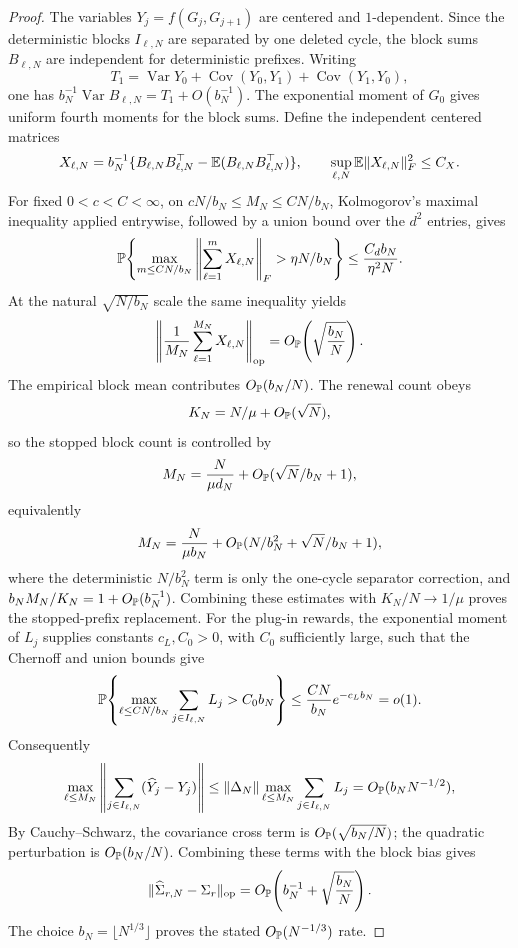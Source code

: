 \begin{lemma}
\begin{proof}
The variables \(Y_j=f(G_j,G_{j+1})\) are centered and \(1\)-dependent.  Since
the deterministic blocks \(I_{\ell,N}\) are separated by one deleted cycle,
the block sums \(B_{\ell,N}\) are independent for deterministic prefixes.
Writing
\[
T_1=\operatorname{Var}Y_0+\operatorname{Cov}(Y_0,Y_1)
+\operatorname{Cov}(Y_1,Y_0),
\]
one has \(b_N^{-1}\operatorname{Var}B_{\ell,N}=T_1+O(b_N^{-1})\).  The
exponential moment of \(G_0\) gives uniform fourth moments for the block sums.
Define the independent centered matrices
\[
X_{\ell,N}=b_N^{-1}\{B_{\ell,N}B_{\ell,N}^{\top}
-\mathbb{E}(B_{\ell,N}B_{\ell,N}^{\top})\},
\qquad \sup_{\ell,N}\mathbb{E}\|X_{\ell,N}\|_F^2\le C_X.
\]
For fixed \(0<c<C<\infty\), on
\(cN/b_N\le M_N\le CN/b_N\), Kolmogorov's maximal inequality applied
entrywise, followed by a union bound over the \(d^2\) entries, gives
\[
\mathbb{P}\!\left\{
\max_{m\le CN/b_N}\left\|\sum_{\ell=1}^mX_{\ell,N}\right\|_F
>\eta N/b_N\right\}
\le \frac{C_d b_N}{\eta^2N}.
\]
At the natural \(\sqrt{N/b_N}\) scale the same inequality yields
\[
\left\|\frac1{M_N}\sum_{\ell=1}^{M_N}X_{\ell,N}\right\|_{\rm op}
=O_{\mathbb{P}}\!\left(\sqrt{\frac{b_N}{N}}\right).
\]
The empirical block mean contributes \(O_{\mathbb{P}}(b_N/N)\).  The renewal count
obeys
\[
K_N=N/\mu+O_{\mathbb{P}}(\sqrt N),
\]
so the stopped block count is controlled by
\[
M_N=\frac{N}{\mu d_N}+O_{\mathbb{P}}(\sqrt N/b_N+1),
\]
equivalently
\[
M_N=\frac{N}{\mu b_N}
  +O_{\mathbb{P}}(N/b_N^2+\sqrt N/b_N+1),
\]
where the deterministic \(N/b_N^2\) term is only the one-cycle separator
correction, and \(b_NM_N/K_N=1+O_{\mathbb{P}}(b_N^{-1})\).  Combining these estimates
with \(K_N/N\to1/\mu\) proves the stopped-prefix replacement.  For the plug-in
rewards, the exponential moment of \(L_j\) supplies constants \(c_L,C_0>0\),
with \(C_0\) sufficiently large, such that the Chernoff and union bounds give
\[
\mathbb{P}\!\left\{
\max_{\ell\le CN/b_N}\sum_{j\in I_{\ell,N}}L_j>C_0b_N
\right\}
\le \frac{CN}{b_N}e^{-c_Lb_N}=o(1).
\]
Consequently
\[
\max_{\ell\le M_N}\left\|\sum_{j\in I_{\ell,N}}(\widehat Y_j-Y_j)\right\|
\le \|\Delta_N\|\max_{\ell\le M_N}\sum_{j\in I_{\ell,N}}L_j
=O_{\mathbb{P}}(b_NN^{-1/2}),
\]
By Cauchy--Schwarz, the covariance cross term is
\(O_{\mathbb{P}}(\sqrt{b_N/N})\); the quadratic perturbation is
\(O_{\mathbb{P}}(b_N/N)\).  Combining these terms with the block bias gives
\[
\|\widehat\Sigma_{r,N}-\Sigma_r\|_{\rm op}
=O_{\mathbb{P}}\!\left(b_N^{-1}+\sqrt{\frac{b_N}{N}}\right).
\]
The choice \(b_N=\lfloor N^{1/3}\rfloor\) proves the stated
\(O_{\mathbb{P}}(N^{-1/3})\) rate.
\end{proof}
\end{lemma}


